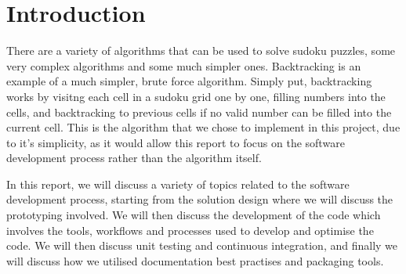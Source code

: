 
\section{Introduction}\label{sec:intro}
    There are a variety of algorithms that can be used to solve sudoku puzzles, some very complex algorithms and some
    much simpler ones.
    Backtracking is an example of a much simpler, brute force algorithm.
    Simply put, backtracking works by visitng each cell in a sudoku grid one by one, filling numbers into the cells,
    and backtracking to previous cells if no valid number can be filled into the current cell.
    This is the algorithm that we chose to implement in this project, due to it's simplicity, as it would allow this
    report to focus on the software development process rather than the algorithm itself.

    In this report, we will discuss a variety of topics related to the software development process, starting from
    the solution design where we will discuss the prototyping involved.
    We will then discuss the development of the code which involves the tools, workflows and processes used to develop
    and optimise the code.
    We will then discuss unit testing and continuous integration, and finally we will discuss how we utilised
    documentation best practises and packaging tools.
